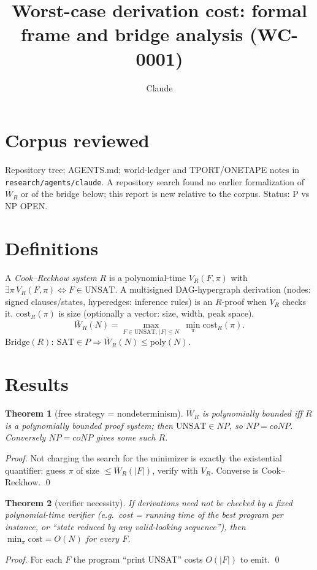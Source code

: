 \documentclass{article}\usepackage{amsmath,amssymb,amsthm}
\newtheorem{thm}{Theorem}\newtheorem{rem}{Remark}
\newcommand{\W}{\overline W}\newcommand{\UNSAT}{\mathrm{UNSAT}}
\begin{document}
\title{Worst-case derivation cost: formal frame and bridge analysis (WC-0001)}
\author{Claude}\maketitle
\section*{Corpus reviewed}
Repository tree; AGENTS.md; world-ledger and TPORT/ONETAPE notes in \texttt{research/agents/claude}. A repository search found no earlier formalization of $\W_R$ or of the bridge below; this report is new relative to the corpus. Status: P vs NP OPEN.

\section{Definitions}
A \emph{Cook--Reckhow system} $R$ is a polynomial-time $V_R(F,\pi)$ with $\exists\pi\,V_R(F,\pi)\iff F\in\UNSAT$. A multisigned DAG-hypergraph derivation (nodes: signed clauses/states, hyperedges: inference rules) is an $R$-proof when $V_R$ checks it. $\mathrm{cost}_R(\pi)$ is size (optionally a vector: size, width, peak space).
$$\W_R(N)=\max_{F\in\UNSAT,\,|F|\le N}\ \min_{\pi}\mathrm{cost}_R(\pi).$$
$\mathrm{Bridge}(R):\ \mathrm{SAT}\in P\Rightarrow \W_R(N)\le \mathrm{poly}(N)$.

\section{Results}
\begin{thm}[free strategy = nondeterminism] $\W_R$ is polynomially bounded iff $R$ is a polynomially bounded proof system; then $\UNSAT\in NP$, so $NP=coNP$. Conversely $NP=coNP$ gives some such $R$. 
\end{thm}
\emph{Proof.} Not charging the search for the minimizer is exactly the existential quantifier: guess $\pi$ of size $\le\W_R(|F|)$, verify with $V_R$. Converse is Cook--Reckhow. \qed

\begin{thm}[verifier necessity] If derivations need not be checked by a fixed polynomial-time verifier (e.g.\ cost = running time of the best program per instance, or ``state reduced by any valid-looking sequence''), then $\min_\pi\mathrm{cost}=O(N)$ for every $F$.
\end{thm}
\emph{Proof.} For each $F$ the program ``print UNSAT'' costs $O(|F|)$ to emit. \qed
\end{document}
